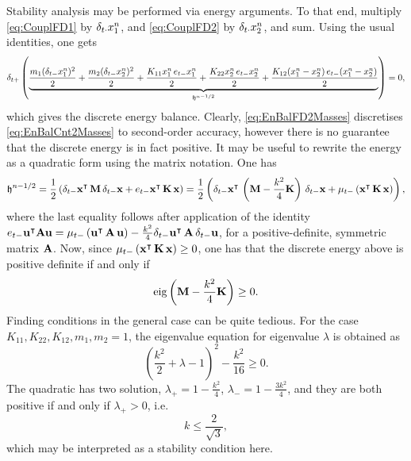 Stability analysis may be performed via energy arguments. To that end, multiply \eqref{eq:CouplFD1} by $\delta_{t\cdot} x^n_1$, and \eqref{eq:CouplFD2} by $\delta_{t\cdot} x^n_2$, and sum. Using the usual identities, one gets
\begin{equation}\label{eq:EnBalFD2Masses}
\delta_{t+} \left(\underbrace{\frac{m_1(\delta_{t-} x^n_1)^2}{2} + \frac{m_2(\delta_{t-} x^n_2)^2}{2} + \frac{K_{11}x_1^n \, e_{t-} x_1^n}{2}  + \frac{K_{22}x_2^n \, e_{t-} x_2^n}{2} + \frac{K_{12}(x_1^n-x_2^n) \, e_{t-} (x_1^n-x_2^n)}{2}}_{{\mathfrak h}^{n-1/2}}\right)  = 0,
\end{equation}
which gives the discrete energy balance. Clearly, \eqref{eq:EnBalFD2Masses} discretises \eqref{eq:EnBalCnt2Masses} to second-order accuracy, however there is no guarantee that the discrete energy is in fact positive. It may be useful to rewrite the energy as a quadratic form using the matrix notation. One has
\begin{equation}
\mathfrak{h}^{n-1/2} = \frac{1}{2}\left({\delta_{t-} {\bf x}}^{\intercal}\,{\bf M}\, {\delta_{t-} {\bf x}} + e_{t-}{\bf x}^\intercal \,{\bf K}\, { {\bf x}}\right) = \frac{1}{2}\left( \delta_{t-} {\bf x}^{\intercal}\,\left({\bf M}-\frac{k^2}{4}{\bf K}\right)\, \delta_{t-} {\bf x} + \mu_{t-} \left({\bf x}^{\intercal}\,{\bf K}\, {\bf x}\right) \right),
\end{equation}
where the last equality follows after application of the  identity $e_{t-} {\bf u}^\intercal  {\bf A} {\bf u}= \mu_{t-} \left({\bf u}^\intercal \,{\bf A}\, {\bf u}\right) - \frac{k^2}{4}\delta_{t-}{\bf u}^\intercal \,{\bf A}\, \delta_{t-} {\bf u}$, for a positive-definite, symmetric matrix $\bf A$. Now, since $\mu_{t-} \left({\bf x}^{\intercal}\,{\bf K}\,  {\bf x} \right) \geq 0$, one has that the discrete energy above is positive definite if and only if
\begin{equation}
\text{eig}\left({\bf M}-\frac{k^2}{4}{\bf K}\right) \geq 0.
\end{equation}
Finding conditions in the general case can be quite tedious. For the case  $K_{11},K_{22},K_{12},m_1,m_2=1$, the eigenvalue equation for eigenvalue $\lambda$ is obtained as
\begin{equation}
\left(\frac{k^2}{2} + \lambda - 1\right)^2 - \frac{k^2}{16}  \geq 0.
\end{equation}
The quadratic has two solution, $\lambda_+ = 1 - \frac{k^2}{4}$, $\lambda_- = 1 - \frac{3 k^2}{4}$, and they are both positive if and only if $\lambda_+ > 0$, i.e. 
\begin{equation}\label{eq:TwoMassesStabCond}
k \leq \frac{2}{\sqrt{3}},
\end{equation}
which may be interpreted as a stability condition here. 


